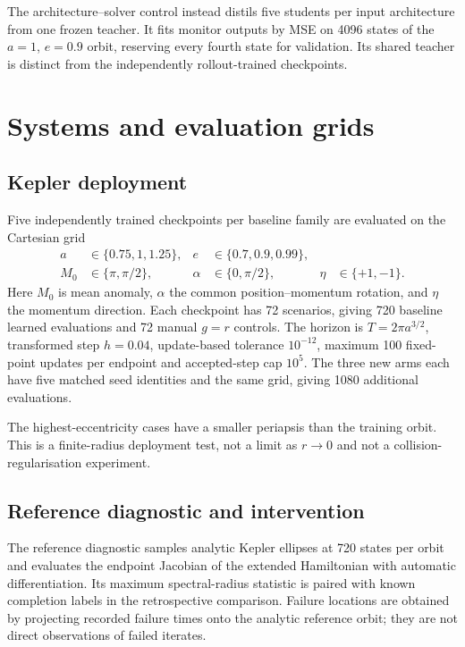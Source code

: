 \documentclass[11pt]{article}
\begin{document}
The architecture--solver control instead distils five students per input
architecture from one frozen teacher. It fits monitor outputs by MSE on
4096 states of the $a=1$, $e=0.9$ orbit, reserving every fourth state for
validation. Its shared teacher is distinct from the independently
rollout-trained checkpoints.

\section{Systems and evaluation grids}

\subsection{Kepler deployment}

Five independently trained checkpoints per baseline family are evaluated
on the Cartesian grid
\[
\begin{aligned}
a&\in\{0.75,1,1.25\}, & e&\in\{0.7,0.9,0.99\},\\
M_0&\in\{\pi,\pi/2\}, & \alpha&\in\{0,\pi/2\}, &
\eta&\in\{+1,-1\}.
\end{aligned}
\]
Here $M_0$ is mean anomaly, $\alpha$ the common position--momentum
rotation, and $\eta$ the momentum direction. Each checkpoint has
72 scenarios, giving 720 baseline learned evaluations and 72 manual
$g=r$ controls. The horizon is $T=2\pi a^{3/2}$, transformed step
$h=0.04$, update-based tolerance $10^{-12}$, maximum 100 fixed-point
updates per endpoint and accepted-step cap $10^5$.
The three new arms each have five matched seed identities and the same
grid, giving 1080 additional evaluations.

The highest-eccentricity cases have a smaller periapsis than the training
orbit. This is a finite-radius deployment test, not a limit as $r\to0$ and
not a collision-regularisation experiment.

\subsection{Reference diagnostic and intervention}

The reference diagnostic samples analytic Kepler ellipses at 720 states per
orbit and evaluates the endpoint Jacobian of the extended Hamiltonian with
automatic differentiation. Its maximum spectral-radius statistic is paired
with known completion labels in the retrospective comparison. Failure
locations are obtained by projecting recorded failure times onto the
analytic reference orbit; they are not direct observations of failed
iterates.
\end{document}

